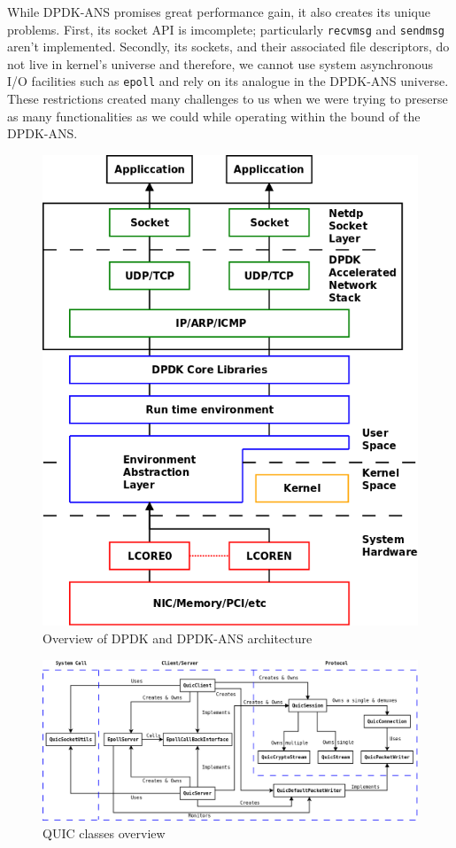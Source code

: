 \documentclass{sig-alternate-05-2015}
\begin{document}
While DPDK-ANS promises great performance gain, it also creates its unique problems. First, its socket API is imcomplete; particularly \texttt{recvmsg} and \texttt{sendmsg} aren't implemented. Secondly, its sockets, and their associated file descriptors, do not live in kernel's universe and therefore, we cannot use system asynchronous I/O facilities such as \texttt{epoll} and rely on its analogue in the DPDK-ANS universe. These restrictions created many challenges to us when we were trying to preserse as many functionalities as we could while operating within the bound of the DPDK-ANS.
 
\begin{figure}[h]
\centering
\includegraphics[scale=0.3]{dpdk_archi.png}
\caption{Overview of DPDK and DPDK-ANS architecture}
\label{fig:dpdk-archi}
\end{figure} 

\begin{figure}
\centering
\includegraphics[scale=0.28]{class.png}
\caption{QUIC classes overview}
\end{figure}
\end{document}
